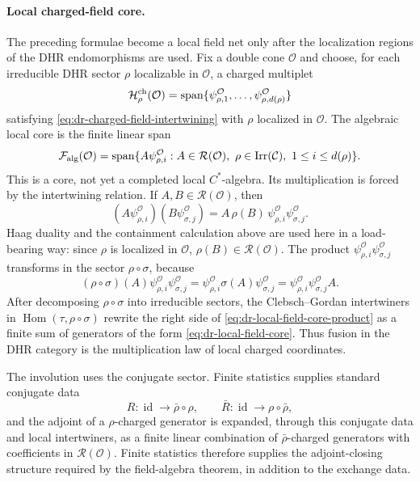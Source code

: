 \paragraph{Local charged-field core.}
The preceding formulae become a local field net only after the localization
regions of the DHR endomorphisms are used.  Fix a double cone \(\mathcal O\)
and choose, for each irreducible DHR sector \(\rho\) localizable in
\(\mathcal O\), a charged multiplet
\[
  \mathcal H_\rho^{\rm ch}(\mathcal O)
  =
  \operatorname{span}\{\psi_{\rho,1}^{\mathcal O},\ldots,
  \psi_{\rho,d(\rho)}^{\mathcal O}\}
\]
satisfying \eqref{eq:dr-charged-field-intertwining} with \(\rho\) localized
in \(\mathcal O\).  The algebraic local core is the finite linear span
\begin{equation}
  \mathcal F_{\rm alg}(\mathcal O)
  =
  \operatorname{span}\{
    A\psi_{\rho,i}^{\mathcal O}:
    A\in\mathcal R(\mathcal O),\
    \rho\in{\rm Irr}(\mathcal C),\
    1\le i\le d(\rho)
  \}.
  \label{eq:dr-local-field-core}
\end{equation}
This is a core, not yet a completed local \(C^*\)-algebra.  Its multiplication
is forced by the intertwining relation.  If \(A,B\in\mathcal R(\mathcal O)\),
then
\begin{equation}
  (A\psi_{\rho,i}^{\mathcal O})(B\psi_{\sigma,j}^{\mathcal O})
  =
  A\,\rho(B)\,
  \psi_{\rho,i}^{\mathcal O}\psi_{\sigma,j}^{\mathcal O}.
  \label{eq:dr-local-field-core-product}
\end{equation}
Haag duality and the containment calculation above are used here in a
load-bearing way: since \(\rho\) is localized in \(\mathcal O\),
\(\rho(B)\in\mathcal R(\mathcal O)\).  The product
\(\psi_{\rho,i}^{\mathcal O}\psi_{\sigma,j}^{\mathcal O}\) transforms in the
sector \(\rho\circ\sigma\), because
\[
  (\rho\circ\sigma)(A)
  \psi_{\rho,i}^{\mathcal O}\psi_{\sigma,j}^{\mathcal O}
  =
  \psi_{\rho,i}^{\mathcal O}\sigma(A)\psi_{\sigma,j}^{\mathcal O}
  =
  \psi_{\rho,i}^{\mathcal O}\psi_{\sigma,j}^{\mathcal O}A .
\]
After decomposing \(\rho\circ\sigma\) into irreducible sectors, the
Clebsch--Gordan intertwiners in
\(\operatorname{Hom}(\tau,\rho\circ\sigma)\) rewrite the right side of
\eqref{eq:dr-local-field-core-product} as a finite sum of generators of the
form \eqref{eq:dr-local-field-core}.  Thus fusion in the DHR category is the
multiplication law of local charged coordinates.

The involution uses the conjugate sector.  Finite statistics supplies
standard conjugate data
\[
  R:\operatorname{id}\to \bar\rho\circ\rho,
  \qquad
  \bar R:\operatorname{id}\to \rho\circ\bar\rho ,
\]
and the adjoint of a \(\rho\)-charged generator is expanded, through this
conjugate data and local intertwiners, as a finite linear combination of
\(\bar\rho\)-charged generators with coefficients in
\(\mathcal R(\mathcal O)\).  Finite statistics therefore supplies the
adjoint-closing structure required by the field-algebra theorem, in addition
to the exchange data.

